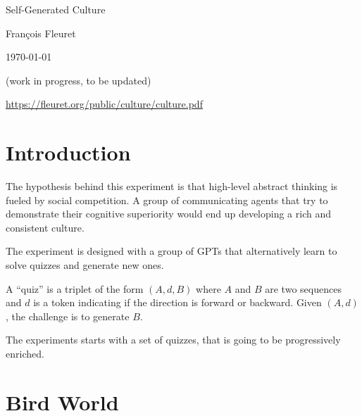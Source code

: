 \documentclass[11pt,a4paper,oneside]{article}
\begin{document}
\vspace*{-3ex}

\begin{center}
{\Large Self-Generated Culture}

Fran\c cois Fleuret

\today

\vspace*{2ex}

\centerline{\color{red}(work in progress, to be updated)}

\medskip

\centerline{\url{https://fleuret.org/public/culture/culture.pdf}}

\end{center}

\section{Introduction}

The hypothesis behind this experiment is that high-level abstract
thinking is fueled by social competition. A group of communicating
agents that try to demonstrate their cognitive superiority would end
up developing a rich and consistent culture.

The experiment is designed with a group of GPTs that alternatively
learn to solve quizzes and generate new ones.

A ``quiz'' is a triplet of the form $(A, d, B)$ where $A$ and $B$ are
two sequences and $d$ is a token indicating if the direction is
forward or backward. Given $(A, d)$, the challenge is to generate $B$.

The experiments starts with a set of quizzes, that is going to be
progressively enriched.

\section{Bird World}
\end{document}
